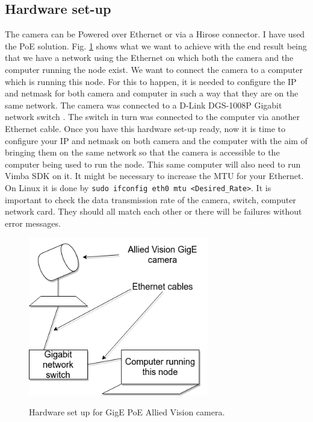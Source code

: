 \documentclass[a4paper, 12pt, oneside]{report}
\begin{document}
  \subsection{Hardware set-up}
  The camera can be Powered over Ethernet or via a Hirose connector. I have used the PoE solution. 
  Fig. \ref{fig:hrdwr avt} shows what we want to achieve with the end result being that we have a network using the Ethernet on which both the camera and the computer running the node exist.
  We want to connect the camera to a computer which is running this node. For this to happen, it is needed to configure the IP and netmask for both camera and computer in such a way that they are on the same network. The camera was connected to a D-Link DGS-1008P Gigabit network switch \cite{DLinkDGS1008P8PortGigabitEthernetPoESwitchDLinkWorkscom-2020-02-17}. The switch in turn was connected to the computer via another Ethernet cable. Once you have this hardware set-up ready, now it is time to configure your IP and netmask on both camera and the computer with the aim of bringing them on the same network so that the camera is accessible to the computer being used to run the node. This same computer will also need to run Vimba SDK \cite{VimbaTheSDKforAlliedVisionCamerasAlliedVision-2020-02-17} on it. It might be necessary to increase the MTU \cite{MaximumtransmissionunitWikipedia-2020-02-10} for your Ethernet. On Linux it is done by \texttt{sudo ifconfig eth0 mtu <Desired\_Rate>}. It is important to check the data transmission rate of the camera, switch, computer network card. They should all match each other or there will be failures without error messages. 
 
 
  \begin{figure}[h]
      \caption{Hardware set up for GigE PoE Allied Vision camera.}
      \centering
      \includegraphics[width=0.7\textwidth]{avtcamera_hardware_set_up}
      \label{fig:hrdwr avt}
  \end{figure}
  
\end{document}
